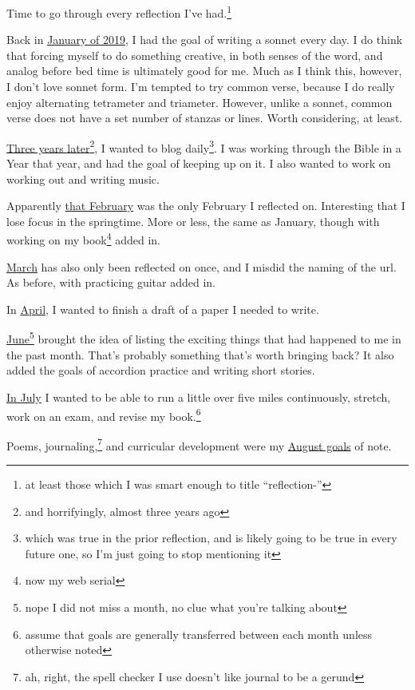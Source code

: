 \documentclass[12pt]{article}[titlepage]
\newcommand{\say}[1]{``#1''}
\renewcommand{\,}{\textsuperscript{,}}
\begin{document}
Time to go through every reflection I've had.\footnote{at least those which I was smart enough to title \say{reflection-}}

Back in \href{reflection-january-19}{January of 2019}, I had the goal of writing a sonnet every day.  
I do think that forcing myself to do something creative, in both senses of the word, and analog before bed time is ultimately good for me.  
Much as I think this, however, I don't love sonnet form.  
I'm tempted to try common verse, because I do really enjoy alternating tetrameter and triameter.  
However, unlike a sonnet, common verse does not have a set number of stanzas or lines.  
Worth considering, at least.

\href{reflection-january-22}{Three years later}\footnote{and horrifyingly, almost three years ago}, I wanted to blog daily\footnote{which was true in the prior reflection, and is likely going to be true in every future one, so I'm just going to stop mentioning it}.  
I was working through the Bible in a Year that year, and had the goal of keeping up on it.  
I also wanted to work on working out and writing music.

Apparently \href{reflection-february-22}{that February} was the only February I reflected on.  
Interesting that I lose focus in the springtime.  
More or less, the same as January, though with working on my book\footnote{now my web serial} added in.

\href{reflection-march-2022}{March} has also only been reflected on once, and I misdid the naming of the url.  
As before, with practicing guitar added in.

In \href{reflection-april-2022}{April}, I wanted to finish a draft of a paper I needed to write.

\href{reflection-june-2022}{June}\footnote{nope I did not miss a month, no clue what you're talking about} brought the idea of listing the exciting things that had happened to me in the past month.  
That's probably something that's worth bringing back?  
It also added the goals of accordion practice and writing short stories.

\href{reflection-july-2022}{In July} I wanted to be able to run a little over five miles continuously, stretch, work on an exam, and revise my book.\footnote{assume that goals are generally transferred between each month unless otherwise noted}

Poems, journaling,\footnote{ah, right, the spell checker I use doesn't like journal to be a gerund} and curricular development were my \href{reflection-august-2022}{August goals} of note.
\end{document}
